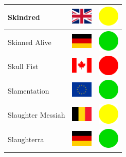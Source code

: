 \documentclass[12pt, a4paper, twoside]{report}
\begin{document}
\begin{center}
\begin{longtable}{|p{5cm}|p{2cm}|p{2cm}|}
 Skindred                                                   & \includegraphics[width=1cm]{../4x3/gb} &   \includegraphics[width=1cm]{../likes/m} \\ \hline
 Skinned Alive                                              & \includegraphics[width=1cm]{../4x3/de} &   \includegraphics[width=1cm]{../likes/y} \\ \hline
 Skull Fist                                                 & \includegraphics[width=1cm]{../4x3/ca} &   \includegraphics[width=1cm]{../likes/n} \\ \hline
 Slamentation                                               & \includegraphics[width=1cm]{../4x3/eu} &   \includegraphics[width=1cm]{../likes/y} \\ \hline
 Slaughter Messiah                                          & \includegraphics[width=1cm]{../4x3/be} &   \includegraphics[width=1cm]{../likes/m} \\ \hline
 Slaughterra                                                & \includegraphics[width=1cm]{../4x3/de} &   \includegraphics[width=1cm]{../likes/y} \\ \hline

\end{longtable}
\end{center}
\end{document}
